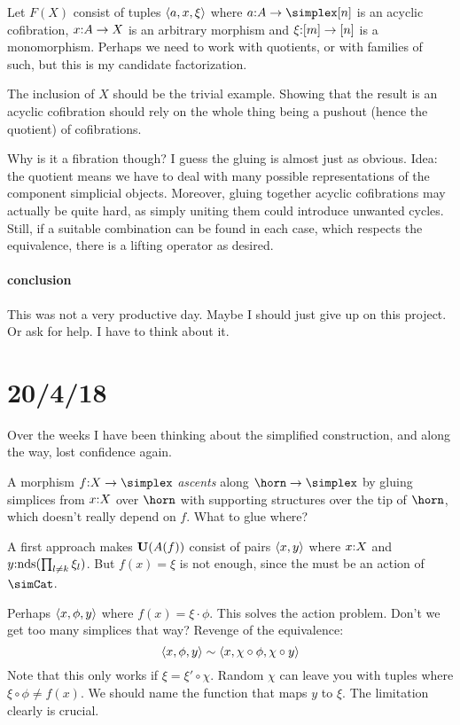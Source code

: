 \documentclass[csh.tex]{subfiles}
\begin{document}
Let $F(X)$ consist of tuples $\left\langle a,x,\xi \right\rangle$ where $a\of A\to\simplex[n]$ is an acyclic cofibration, $x\mathord : A\to X$ is an arbitrary morphism and $\xi\mathord : [m]\to [n]$ is a monomorphism.
Perhaps we need to work with quotients, or with families of such, but this is my candidate factorization.

The inclusion of $X$ should be the trivial example. Showing that the result is an acyclic cofibration should rely on the whole thing being a pushout (hence the quotient) of cofibrations.

Why is it a fibration though?
I guess the gluing is almost just as obvious. Idea: the quotient means we have to deal with many possible representations of the component simplicial objects. Moreover, gluing together acyclic cofibrations may actually be quite hard, as simply uniting them could introduce unwanted cycles. Still, if a suitable combination can be found in each case, which respects the equivalence, there is a lifting operator as desired.

\paragraph{conclusion}
This was not a very productive day. Maybe I should just give up on this project. Or ask for help. I have to think about it.

\section{20/4/18}
Over the weeks I have been thinking about the simplified construction,
and along the way, lost confidence again.

A morphism $f\of X\to \simplex$ \emph{ascents} along $\horn\to\simplex$ by gluing simplices from $x\mathord : X$ over $\horn$ with supporting structures over the tip of $\horn$, which doesn't really depend on $f$. What to glue where?

A first approach makes $\mathbf{U}(A(f))$ consist of pairs $\left\langle x,y \right\rangle$ where $x\mathord : X$ and $y\mathord :\mathrm{nds}(\prod_{l\neq k}\xi_l)$. But $f(x) = \xi$ is not enough, since the must be an action of $\simCat$.

Perhaps $\left\langle x,\phi,y \right\rangle$ where $f(x) = \xi\cdot \phi$. This solves the action problem. Don't we get too many simplices that way?
Revenge of the equivalence:
\[ \left\langle x,\phi,y \right\rangle\sim \left\langle x,\chi\circ\phi,\chi\circ y \right\rangle \]
Note that this only works if $\xi = \xi'\circ \chi$. Random $\chi$ can leave you with tuples where $\xi\circ \phi\neq f(x)$. We should name the function that maps $y$ to $\xi$. The limitation clearly is crucial.
\end{document}
